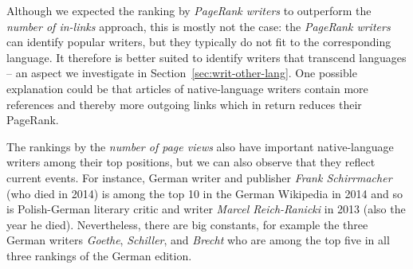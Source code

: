 \documentclass[a4paper,12pt]{scrartcl}
\begin{document}
\enlargethispage{\baselineskip}
Although we expected the ranking by \emph{PageRank writers} to
outperform the \emph{number of in-links} approach, this is mostly not
the case: the \emph{PageRank writers} can identify popular writers,
but they typically do not fit to the corresponding language. It
therefore is better suited to identify writers that transcend
languages -- an aspect we investigate in
Section~\ref{sec:writ-other-lang}.
%
One possible explanation could be that articles of native-language
writers contain more references and thereby more outgoing links which
in return reduces their PageRank.


%
%







The rankings by the \emph{number of page views} also have important
native-language writers among their top positions, but we can also
observe that they reflect current events. For instance, German writer
and publisher \emph{Frank Schirrmacher} (who died in 2014) is among
the top 10 in the German Wikipedia in 2014 and so is Polish-German
literary critic and writer \emph{Marcel Reich-Ranicki} in 2013 (also
the year he died).
%
Nevertheless, there are big constants, for example the three German
writers \emph{Goethe}, \emph{Schiller},
and \emph{Brecht} who are among the top five in all three
rankings of the German edition.
%
\end{document}
